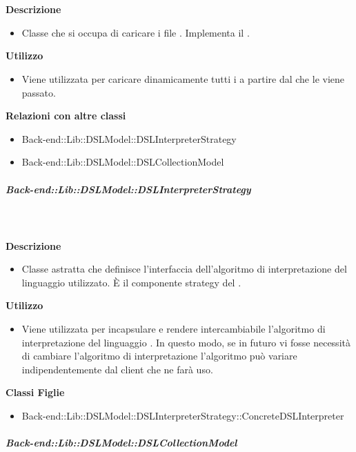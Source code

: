         \textbf{\\ \\ Descrizione} 
          \begin{itemize}
            \item[] Classe che si occupa di caricare i file . Implementa il  .
          \end{itemize}      
        \textbf{Utilizzo}  
          \begin{itemize}
            \item[] Viene utilizzata per caricare dinamicamente tutti i  a partire dal  che le viene passato.
          \end{itemize}
          \textbf{Relazioni con altre classi}
          \begin{itemize}
              \item{Back-end::Lib::DSLModel::DSLInterpreterStrategy}
              \item{Back-end::Lib::DSLModel::DSLCollectionModel}
          \end{itemize}
      \subparagraph{Back-end::Lib::DSLModel::DSLInterpreterStrategy}
        
        \textbf{\\ \\ Descrizione} 
          \begin{itemize}
            \item[] Classe astratta che definisce l'interfaccia dell'algoritmo di interpretazione del linguaggio  utilizzato. È il componente strategy del  .
          \end{itemize}      
        \textbf{Utilizzo}  
          \begin{itemize}
            \item[] Viene utilizzata per incapsulare e rendere intercambiabile l'algoritmo di interpretazione del linguaggio . In questo modo, se in futuro vi fosse necessità di cambiare l'algoritmo di interpretazione l'algoritmo può variare indipendentemente dal client che ne farà uso.
          \end{itemize}
          \textbf{Classi Figlie}
          \begin{itemize}
              \item{Back-end::Lib::DSLModel::DSLInterpreterStrategy::ConcreteDSLInterpreter}
          \end{itemize}
      \subparagraph{Back-end::Lib::DSLModel::DSLCollectionModel}
        
